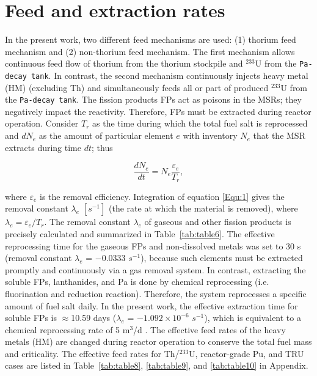 \section{Feed and extraction rates} \label{Feed-and-extraction-rates}
In the present work, two different feed mechanisms are used: (1) thorium feed mechanism and (2) non-thorium feed mechanism.
The first mechanism allows continuous feed flow of thorium from the thorium stockpile and 
$^{233}$U from the \texttt{Pa-decay tank}. In contrast, the second mechanism 
continuously injects heavy metal (HM) (excluding Th) and simultaneously feeds  
all or part of produced $^{233}$U from the \texttt{Pa-decay tank}. The fission 
products \gls{FPs} act as poisons in the MSRs; they negatively impact the reactivity. 
Therefore, \gls{FPs} must be extracted during reactor operation. Consider 
$T_{r}$ as the time during which the total fuel salt is reprocessed and 
$dN_{e}$ as the amount of particular element $e$ with inventory $N_{e}$ that 
the \gls{MSR} extracts during time $dt$; thus \cite{nuttin2005potential}

\begin{equation}
\label{Equ:1}
\dfrac{dN_{e}}{dt} = N_{e}\dfrac{\varepsilon_{e}}{T_{r}},	
\end{equation}

where $\varepsilon_{e}$ is the removal efficiency. Integration of equation \ref{Equ:1} gives 
the removal constant $\lambda_{e}$ $[s^{-1}]$ (the rate at which the material 
is removed), where $\lambda_{e}=\varepsilon_{e}/T_{r}$. The removal constant 
$\lambda_{e}$ of gaseous and other fission products is precisely calculated 
and summarized in Table~\ref{tab:table6}. The effective reprocessing time for 
the gaseous \gls{FPs} and non-dissolved metals was set to 30 s (removal 
constant $\lambda_{e}$ = $-0.0333$ $s^{-1}$), because such elements must be 
extracted promptly and continuously via a gas removal system. In contrast, 
extracting the soluble \gls{FPs}, lanthanides, and Pa is done by 
chemical reprocessing (i.e. fluorination and reduction reaction). 
Therefore, the system reprocesses a specific amount of fuel salt daily. In the 
present work, the effective extraction time for soluble \gls{FPs} is 
$\approx$10.59 days ($\lambda_{e}$ = $-1.092\times10^{-6}$ $s^{-1}$), which is 
equivalent to a chemical reprocessing rate of 5 m$^3$/d 
\cite{li_optimization_2018,nuttin2005potential}. The effective feed rates of 
the heavy metals (HM) are changed during reactor operation to conserve the 
total fuel mass and criticality. The effective feed rates for Th/$^{233}$U, reactor-grade Pu, and TRU cases are listed in Table~\ref{tab:table8}, \ref{tab:table9}, and \ref{tab:table10} in Appendix.


